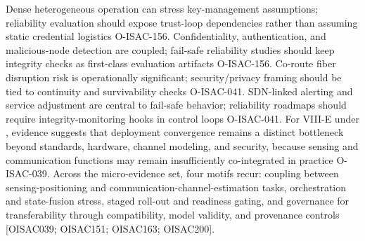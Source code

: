 {}
\markdownRendererSectionEnd \markdownRendererSectionBegin
{}\markdownRendererInterblockSeparator
{}\markdownRendererUlBeginTight
\markdownRendererUlItem Dense heterogeneous operation can stress key-management assumptions; reliability evaluation should expose trust-loop dependencies rather than assuming static credential logistics O-ISAC-156.\markdownRendererUlItemEnd 
\markdownRendererUlItem Confidentiality, authentication, and malicious-node detection are coupled; fail-safe reliability studies should keep integrity checks as first-class evaluation artifacts O-ISAC-156.\markdownRendererUlItemEnd 
\markdownRendererUlItem Co-route fiber disruption risk is operationally significant; security/privacy framing should be tied to continuity and survivability checks O-ISAC-041.\markdownRendererUlItemEnd 
\markdownRendererUlItem SDN-linked alerting and service adjustment are central to fail-safe behavior; reliability roadmaps should require integrity-monitoring hooks in control loops O-ISAC-041.\markdownRendererUlItemEnd 
\markdownRendererUlEndTight \markdownRendererInterblockSeparator
{}
\markdownRendererSectionEnd 
\markdownRendererSectionEnd \markdownRendererSectionBegin
{}\markdownRendererInterblockSeparator
{}\markdownRendererSectionBegin
{}\markdownRendererInterblockSeparator
{}For VIII-E under , evidence suggests that deployment convergence remains a distinct bottleneck beyond standards, hardware, channel modeling, and security, because sensing and communication functions may remain insufficiently co-integrated in practice O-ISAC-039. Across the micro-evidence set, four motifs recur: coupling between sensing-positioning and communication-channel-estimation tasks, orchestration and state-fusion stress, staged roll-out and readiness gating, and governance for transferability through compatibility, model validity, and provenance controls [O\markdownRendererUnderscore{}ISAC\markdownRendererUnderscore{}039; O\markdownRendererUnderscore{}ISAC\markdownRendererUnderscore{}151; O\markdownRendererUnderscore{}ISAC\markdownRendererUnderscore{}163; O\markdownRendererUnderscore{}ISAC\markdownRendererUnderscore{}200].\markdownRendererInterblockSeparator
{}
\markdownRendererSectionEnd \markdownRendererSectionBegin
{}\markdownRendererInterblockSeparator

